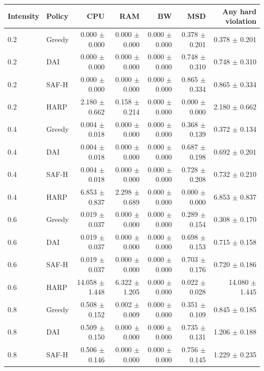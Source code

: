 \begin{table}[p]
\centering
\color{revisiongreen}\small
\begin{tabular}{llrrrrr}
\toprule
Intensity & Policy & CPU & RAM & BW & MSD & Any hard violation \\
\midrule
0.2 & Greedy & 0.000 $\pm$ 0.000 & 0.000 $\pm$ 0.000 & 0.000 $\pm$ 0.000 & 0.378 $\pm$ 0.201 & 0.378 $\pm$ 0.201 \\
0.2 & DAI & 0.000 $\pm$ 0.000 & 0.000 $\pm$ 0.000 & 0.000 $\pm$ 0.000 & 0.748 $\pm$ 0.310 & 0.748 $\pm$ 0.310 \\
0.2 & SAF-H & 0.000 $\pm$ 0.000 & 0.000 $\pm$ 0.000 & 0.000 $\pm$ 0.000 & 0.865 $\pm$ 0.334 & 0.865 $\pm$ 0.334 \\
0.2 & HARP & 2.180 $\pm$ 0.662 & 0.158 $\pm$ 0.214 & 0.000 $\pm$ 0.000 & 0.000 $\pm$ 0.000 & 2.180 $\pm$ 0.662 \\
0.4 & Greedy & 0.004 $\pm$ 0.018 & 0.000 $\pm$ 0.000 & 0.000 $\pm$ 0.000 & 0.368 $\pm$ 0.139 & 0.372 $\pm$ 0.134 \\
0.4 & DAI & 0.004 $\pm$ 0.018 & 0.000 $\pm$ 0.000 & 0.000 $\pm$ 0.000 & 0.687 $\pm$ 0.198 & 0.692 $\pm$ 0.201 \\
0.4 & SAF-H & 0.004 $\pm$ 0.018 & 0.000 $\pm$ 0.000 & 0.000 $\pm$ 0.000 & 0.728 $\pm$ 0.208 & 0.732 $\pm$ 0.210 \\
0.4 & HARP & 6.853 $\pm$ 0.837 & 2.298 $\pm$ 0.689 & 0.000 $\pm$ 0.000 & 0.000 $\pm$ 0.000 & 6.853 $\pm$ 0.837 \\
0.6 & Greedy & 0.019 $\pm$ 0.037 & 0.000 $\pm$ 0.000 & 0.000 $\pm$ 0.000 & 0.289 $\pm$ 0.154 & 0.308 $\pm$ 0.170 \\
0.6 & DAI & 0.019 $\pm$ 0.037 & 0.000 $\pm$ 0.000 & 0.000 $\pm$ 0.000 & 0.698 $\pm$ 0.153 & 0.715 $\pm$ 0.158 \\
0.6 & SAF-H & 0.019 $\pm$ 0.037 & 0.000 $\pm$ 0.000 & 0.000 $\pm$ 0.000 & 0.703 $\pm$ 0.176 & 0.720 $\pm$ 0.186 \\
0.6 & HARP & 14.058 $\pm$ 1.448 & 6.322 $\pm$ 1.205 & 0.000 $\pm$ 0.000 & 0.022 $\pm$ 0.028 & 14.080 $\pm$ 1.445 \\
0.8 & Greedy & 0.508 $\pm$ 0.152 & 0.002 $\pm$ 0.009 & 0.000 $\pm$ 0.000 & 0.351 $\pm$ 0.109 & 0.845 $\pm$ 0.185 \\
0.8 & DAI & 0.509 $\pm$ 0.150 & 0.000 $\pm$ 0.000 & 0.000 $\pm$ 0.000 & 0.735 $\pm$ 0.131 & 1.206 $\pm$ 0.188 \\
0.8 & SAF-H & 0.506 $\pm$ 0.146 & 0.000 $\pm$ 0.000 & 0.000 $\pm$ 0.000 & 0.756 $\pm$ 0.145 & 1.229 $\pm$ 0.235 \\

\end{tabular}
\end{table}
